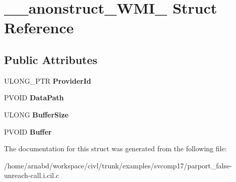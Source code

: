 \hypertarget{struct____anonstruct__WMI__83}{}\section{\+\_\+\+\_\+anonstruct\+\_\+\+W\+M\+I\+\_ Struct Reference}
\label{struct____anonstruct__WMI__83}
\subsection*{Public Attributes}
\begin{DoxyCompactItemize}
\item 
\hypertarget{struct____anonstruct__WMI__83_ac19eaaf91f606001551f9e3ef88482e7}{}U\+L\+O\+N\+G\+\_\+\+P\+T\+R {\bfseries Provider\+Id}\label{struct____anonstruct__WMI__83_ac19eaaf91f606001551f9e3ef88482e7}

\item 
\hypertarget{struct____anonstruct__WMI__83_aa4c25a76d7898392ede4b5f650b20b80}{}P\+V\+O\+I\+D {\bfseries Data\+Path}\label{struct____anonstruct__WMI__83_aa4c25a76d7898392ede4b5f650b20b80}

\item 
\hypertarget{struct____anonstruct__WMI__83_a30d748fac4a209faf04b8831db4aafbe}{}U\+L\+O\+N\+G {\bfseries Buffer\+Size}\label{struct____anonstruct__WMI__83_a30d748fac4a209faf04b8831db4aafbe}

\item 
\hypertarget{struct____anonstruct__WMI__83_a4c22e3ecfd4a92aeae3db5de0bb7ef44}{}P\+V\+O\+I\+D {\bfseries Buffer}\label{struct____anonstruct__WMI__83_a4c22e3ecfd4a92aeae3db5de0bb7ef44}

\end{DoxyCompactItemize}


The documentation for this struct was generated from the following file\+:\begin{DoxyCompactItemize}
\item 
/home/arnabd/workspace/civl/trunk/examples/svcomp17/parport\+\_\+false-\/unreach-\/call.\+i.\+cil.\+c\end{DoxyCompactItemize}
